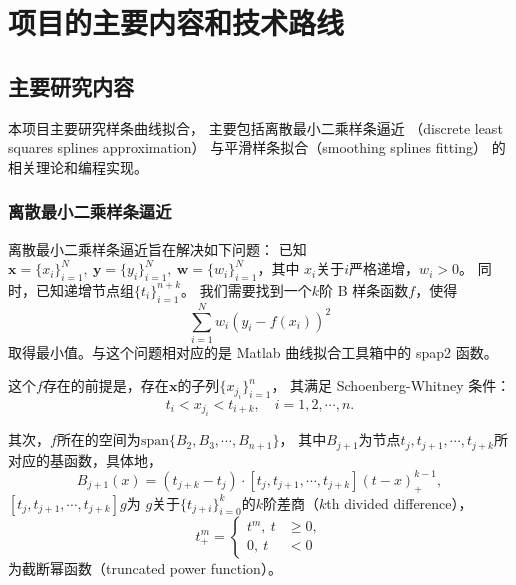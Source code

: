 \section{项目的主要内容和技术路线}

\subsection{主要研究内容}
本项目主要研究样条曲线拟合，
主要包括离散最小二乘样条逼近
（discrete least squares splines approximation）
与平滑样条拟合（smoothing splines fitting）
的相关理论和编程实现。
\subsubsection{离散最小二乘样条逼近}
离散最小二乘样条逼近旨在解决如下问题：
已知$\mathbf{x}=\{x_{i}\}_{i=1}^{N},\ \mathbf{y}=\{y_{i}\}_{i=1}^{N},
\ \mathbf{w}=\{w_{i}\}_{i=1}^{N}$，其中
$x_{i}$关于$i$严格递增，$w_{i}>0$。
同时，已知递增节点组$\{t_{i}\}_{i=1}^{n+k}$。
我们需要找到一个$k$阶 B 样条函数$f$，使得
\begin{equation}
  \label{eq:DiscreteLeastSquaresSplinesApproximation}
  \sum_{i=1}^{N}w_{i}(y_{i}-f(x_{i}))^{2}
\end{equation}
取得最小值。与这个问题相对应的是 Matlab 曲线拟合工具箱中的 spap2 函数。

这个$f$存在的前提是，存在$\mathbf{x}$的子列$\{x_{j_{i}}\}_{i=1}^{n}$，
其满足 Schoenberg-Whitney 条件：
\begin{equation}
  \label{eq:SWcondition}
  t_{i}<x_{j_{i}}<t_{i+k},\quad i=1,2,\cdots,n.
\end{equation}

其次，$f$所在的空间为$\text{span}\{B_{2},B_{3},\cdots,B_{n+1}\}$，
其中$B_{j+1}$为节点$t_{j},t_{j+1},\cdots,t_{j+k}$所对应的基函数，具体地，
\begin{equation}
  \label{eq:basicBSpline}
  B_{j+1}(x)=
  (t_{j+k}-t_{j})\cdot [t_{j},t_{j+1},\cdots,t_{j+k}](t-x)_{+}^{k-1},
\end{equation}
$[t_{j},t_{j+1},\cdots,t_{j+k}]g$为
$g$关于$\{t_{j+i}\}_{i=0}^{k}$的$k$阶差商（$k$th divided difference），
\begin{equation}
  \label{eq:truncatedPowerFunc}
  t_{+}^{m}=
  \left\lbrace
    \begin{aligned}
      t^{m},\ t&\ge 0,\\
      0,\ t&<0
    \end{aligned}
  \right.
\end{equation}
为截断幂函数（truncated power function）。

